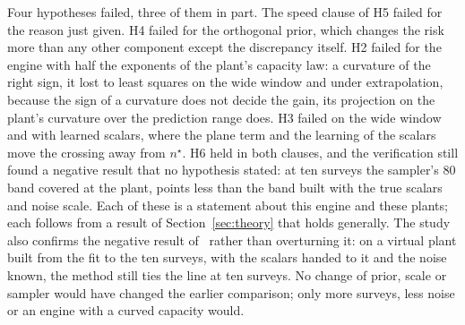 Four hypotheses failed, three of them in part. The speed clause of H5 failed for the reason just given. H4 failed for the
orthogonal prior, which changes the risk more than any other component except the discrepancy itself. H2 failed for the engine
with half the exponents of the plant's capacity law: a curvature of the right sign, it lost to least squares on the wide window
and under extrapolation, because the sign of a curvature does not decide the gain, its projection on the plant's curvature over
the prediction range does. H3 failed on the wide window and with learned scalars, where the plane term and the learning of the
scalars move the crossing away from $n^\star$. H6 held in both clauses, and the verification still found a negative result
that no hypothesis stated: at ten surveys the sampler's 80\pct{} band covered \verCovPooled{} at the plant, \verCovGap{} points
less than the band built with the true scalars and noise scale. Each of these is a statement about
this engine and these plants; each follows from a result of Section~\ref{sec:theory} that holds generally. The study also
confirms the negative result of~\cite{cb002} rather than overturning it: on a virtual plant built from the fit to the ten
surveys, with the scalars handed to it and the noise known, the method still ties the line at ten surveys. No change of prior,
scale or sampler would have changed the earlier comparison; only more surveys, less noise or an engine with a curved capacity
would.

